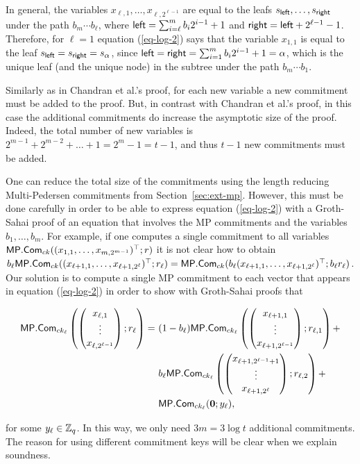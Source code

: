 In general, the variables $x_{\ell,1},\ldots,x_{\ell,2^{\ell-1}}$ are equal to the leafs $s_{{\mathsf{left}}},\ldots,\allowbreak s_{{\mathsf{right}}}$ under the path $b_m\cdots b_\ell$, where ${\mathsf{left}}=\sum_{i=\ell}^m b_i 2^{i-1}+1$ and ${\mathsf{right}}={\mathsf{left}}+2^{\ell-1}-1$. 
Therefore, for $\ell=1$ equation (\ref{eq-log-2}) says that the variable $x_{1,1}$ is equal to the leaf $s_{{\mathsf{left}}}=s_{{\mathsf{right}}}=s_\alpha$, since ${\mathsf{left}}={\mathsf{right}}=\sum_{i=1}^m b_i2^{i-1}+1=\alpha$, which is the unique leaf (and the unique node) in the subtree under the path $b_m\cdots b_1$.

Similarly as in Chandran et al.'s proof, for each new variable a new commitment must be added to the proof. But, in contrast with Chandran et al.'s proof, in this case the additional commitments do increase the asymptotic size of the proof. Indeed, the total number of new variables is \(2^{m-1}+2^{m-2}+\ldots+1=2^m-1=t-1\), and thus $t-1$ new commitments must be added.

One can reduce the total size of the commitments using the length reducing Multi-Pedersen commitments from Section~\ref{sec:ext-mp}. However, this must be done carefully in order to be able to express equation (\ref{eq-log-2}) with a Groth-Sahai proof of an equation that involves the MP commitments and the variables $b_1,\ldots,b_m$. For example, if one computes a single commitment to all variables $\mathsf{MP}.\mathsf{Com}_{ck}((x_{1,1},\ldots,x_{m,2^{m-1}})^\top;r)$ it is not clear how to obtain $b_\ell\mathsf{MP}.\mathsf{Com}_{ck}(\allowbreak (x_{\ell+1,1},\ldots,x_{\ell+1,2^\ell})^\top\allowbreak ;r_\ell)=\mathsf{MP}.\mathsf{Com}_{ck}(b_\ell(x_{\ell+1,1},\ldots,x_{\ell+1,2^\ell})^\top;b_\ell r_\ell)$. Our solution is to compute a single MP commitment to each vector that appears in equation (\ref{eq-log-2}) in order to show with Groth-Sahai proofs that
\begin{small}
\begin{align*}
\MP.\Com_{ck_\ell}\left(
                    \pmatri{x_{\ell,1}\\\vdots\\x_{\ell,2^{\ell-1}}};r_\ell\right)
=\ &(1-b_\ell)\MP.\Com_{ck_\ell}\left(\pmatri{x_{\ell+1,1}\\\vdots\\x_{\ell+1,2^{\ell-1}}};r_{\ell,1}\right)+\\
& b_\ell\MP.\Com_{ck_\ell}\left(\pmatri{x_{\ell+1,2^{\ell-1}+1}\\\vdots\\x_{\ell+1,2^\ell}};r_{\ell,2}\right)+\\
& \MP.\Com_{ck_\ell}(\vecb{0};y_\ell),
\end{align*}\end{small}
for some $y_\ell\in\mathbb{Z}_q$. In this way, we only need $3m=3\log t$ additional commitments. The reason for using different commitment keys will be clear when we explain soundness.

